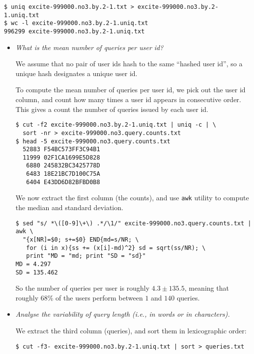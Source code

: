 \begin{lstlisting}
$ uniq excite-999000.no3.by.2-1.txt > excite-999000.no3.by.2-1.uniq.txt
$ wc -l excite-999000.no3.by.2-1.uniq.txt 
996299 excite-999000.no3.by.2-1.uniq.txt
\end{lstlisting}

\begin{itemize}

\item \emph{What is the mean number of queries per user id?}

We assume that no pair of user ids hash to the same ``hashed user id'',
so a unique hash designates a unique user id.

To compute the mean number of queries per user id, we pick out the user id
column, and count how many times a user id appears in consecutive order. This
gives a count the number of queries issued by each user id.

\begin{lstlisting}
$ cut -f2 excite-999000.no3.by.2-1.uniq.txt | uniq -c | \
  sort -nr > excite-999000.no3.query.counts.txt
$ head -5 excite-999000.no3.query.counts.txt 
  52883 F54BC573FF3C94B1
  11999 02F1CA1699E5D828
   6880 245832BC3425778D
   6483 18E21BC7D100C75A
   6404 E43DD6D82BFBD0B8
\end{lstlisting}

We now extract the first column (the counts), and use \texttt{awk} utility to
compute the median and standard deviation.

\begin{lstlisting}
$ sed "s/ *\([0-9]\+\) .*/\1/" excite-999000.no3.query.counts.txt | awk \
  "{x[NR]=$0; s+=$0} END{md=s/NR; \
   for (i in x){ss += (x[i]-md)^2} sd = sqrt(ss/NR); \
   print "MD = "md; print "SD = "sd}"
MD = 4.297
SD = 135.462
\end{lstlisting}

So the number of queries per user is roughly $4.3\pm135.5$, meaning that
roughly 68\% of the users perform between $1$ and $140$ queries.

\item \emph{Analyse the variability of query length (i.e., in words or in
characters).}

We extract the third column (queries), and sort them in lexicographic order:

\begin{lstlisting}
$ cut -f3- excite-999000.no3.by.2-1.uniq.txt | sort > queries.txt
\end{lstlisting}


\end{itemize}
